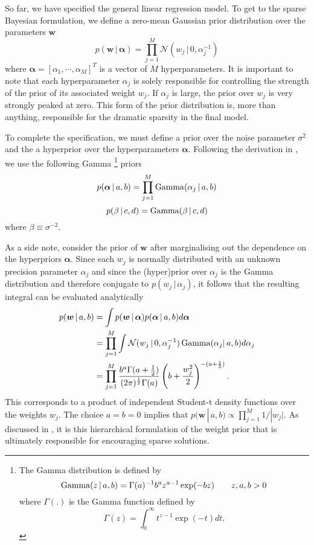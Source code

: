 So far, we have specified the general linear regression model.
To get to the sparse Bayesian formulation, we define a zero-mean Gaussian prior distribution over the parameters $\bm w$
\begin{equation}
\label{eqn:prior_w}
  p(\bm w\,|\,\bm \alpha) = \prod_{j=1}^M \mathcal{N}\left(w_j\,|\,0,\alpha_j^{-1}\right)
\end{equation}
where $\bm \alpha = \left[\alpha_1,\cdots,\alpha_M\right]^T$ is a vector of $M$ hyperparameters.
It is important to note that each hyperparameter $\alpha_j$ is solely responsible for controlling the strength of the prior of its associated weight $w_j$.
If $\alpha_j$ is large, the prior over $w_j$ is very strongly peaked at zero.
This form of the prior distribution is, more than anything, responsible for the dramatic sparsity in the final model.

To complete the specification, we must define a prior over the noise parameter $\sigma^2$ and the a hyperprior over the hyperparameters $\bm \alpha$.
Following the derivation in \cite{tipping2001}, we use the following Gamma
\footnote{
The Gamma distribution is defined by   
\[
\operatorname*{Gamma}(z\,|\,a,b) = \Gamma(a)^{-1} b^a z^{a-1} \exp(-bz)  \qquad z,a,b > 0
\]
where $\Gamma(.)$ is the Gamma function defined by 
\[
\Gamma(z) = \int_0^\infty t^{z-1} \exp(-t) dt.
\]
} priors
\begin{equation}
\label{eqn:prior_alpha}
  p(\bm\alpha\,|\,a,b) = \prod_{j=1}^M \operatorname*{Gamma}(\alpha_j\,|\,a,b)
\end{equation}
\begin{equation}
\label{eqn:prior_beta}
  p(\beta\,|\,c,d) = \operatorname*{Gamma}(\beta\,|\,c,d)
\end{equation}
where $\beta \equiv \sigma^{-2}$.

As a side note, consider the prior of $\bm w$ after marginalising out the dependence on the hyperpriors $\bm\alpha$.
Since each $w_j$ is normally distributed with an unknown precision parameter $\alpha_j$ and since the (hyper)prior over $\alpha_j$ is the Gamma distribution and therefore conjugate to $p(w_j\,|\,\alpha_j)$, it follows that the resulting integral can be evaluated analytically
\begin{equation*}
  \begin{split}
    p(\bm w\,|\,a,b) &= \int p(\bm w\,|\,\bm\alpha) p(\bm\alpha\,|\,a,b)d\bm\alpha\\
    &= \prod_{j=1}^M \int \mathcal{N}(w_j\,|\,0,\alpha_j^{-1}) \operatorname*{Gamma}(\alpha_j|\,a,b)d\alpha_j\\
    &= \prod_{j=1}^M \frac{b^a\Gamma(a+\frac{1}{2})}{(2\pi)^{\frac{1}{2}}\Gamma(a)}\left(b+\frac{w_j^2}{2}\right)^{-(a+\frac{1}{2})}.
\end{split}
\end{equation*}
This corresponds to a product of independent Student-t density functions over the weights $w_j$.
The choice $a=b=0$ implies that $p(\bm w \,|\,a,b) \propto \prod_{j=1}^M 1/|w_j|$.
As discussed in \cite{tipping2001}, it is this hierarchical formulation of the weight prior that is ultimately responsible for encouraging sparse solutions.


